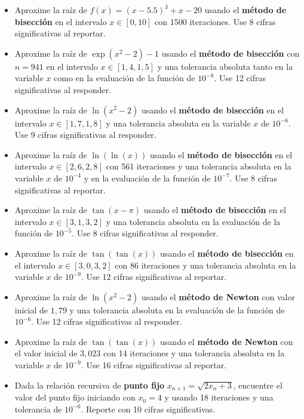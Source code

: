 \documentclass[12pt]{article}
\begin{document}
\begin{itemize}
\item Aproxime la raíz de \(f(x) = (x-5.5)^3 + x - 20\)  usando el \textbf{método de bisección} en el intervalo \(x \in \left[0, 10\right]\) con 1500 iteraciones. Use 8 cifras significativas al reportar.
\item Aproxime la raíz de \(\exp(x^2 - 2) - 1\) usando el \textbf{método de bisección} con \(n=941\) en el intervalo \(x \in \left[1{,}4, 1{,}5\right]\) y una tolerancia absoluta tanto en la variable \(x\) como en la evaluación de la función de \(10^{-8}\). Use 12 cifras significativas al responder.
\item Aproxime la raíz de \(\ln(x^2 - 2)\) usando el \textbf{método de bisección} en el intervalo \(x \in \left[1{,}7, 1{,}8\right]\) y una tolerancia absoluta en la variable \(x\) de \(10^{-6}\). Use 9 cifras significativas al responder.
\item Aproxime la raíz de \(\ln(\ln(x))\)  usando el \textbf{método de bisección} en el intervalo \(x \in \left[2{,}6, 2{,}8\right]\) con 561 iteraciones y una tolerancia absoluta en la variable \(x\) de \(10^{-4}\) y en la evaluación de la función de \(10^{-7}\). Use 8 cifras significativas al reportar.
\item Aproxime la raíz de \(\tan(x - \pi)\) usando el \textbf{método de bisección} en el intervalo \(x \in \left[3{,}1, 3{,}2\right]\) y una tolerancia absoluta en la evaluación de la función de \(10^{-5}\). Use 8 cifras significativas al responder.
\item Aproxime la raíz de \(\tan(\tan(x))\)  usando el \textbf{método de bisección} en el intervalo \(x \in \left[3{,}0, 3{,}2\right]\) con 86 iteraciones y una tolerancia absoluta en la variable \(x\) de \(10^{-9}\). Use 12 cifras significativas al reportar.
\item Aproxime la raíz de \(\ln(x^2 - 2)\)  usando el \textbf{método de Newton} con valor inicial de \(1{,}79\) y una tolerancia absoluta en la evaluación de la función de \(10^{-6}\). Use 12 cifras significativas al responder.
\item Aproxime la raíz de \(\tan(\tan(x))\)  usando el \textbf{método de Newton} con el valor inicial de \(3{,}023\) con 14 iteraciones y una tolerancia absoluta en la variable \(x\) de \(10^{-9}\). Use 16 cifras significativas al reportar.
\item Dada la relación recursiva de \textbf{punto fijo} \(x_{n+1}=\sqrt{2x_n+3}\), encuentre el valor del punto fijo iniciando con \(x_0=4\) y usando 18 iteraciones y una tolerancia de \(10^{-6}\). Reporte con 10 cifras significativas.

\end{itemize}
\end{document}
